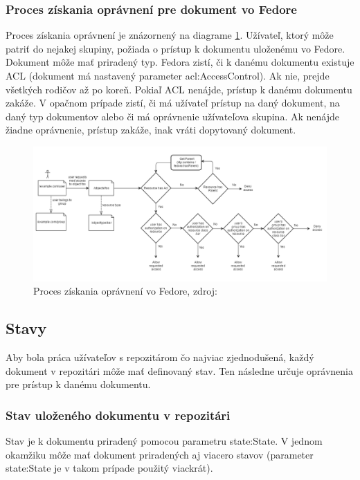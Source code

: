 \documentclass[thesis=M,slovak]{FITthesis}[2013/05/06]
\begin{document}
\subsubsection{Proces získania oprávnení pre dokument vo Fedore}
Proces získania oprávnení je znázornený na diagrame \ref{graphics:ACLFedoraFlow}. Užívateľ, ktorý môže patriť do nejakej skupiny, požiada o prístup k dokumentu uloženému vo Fedore. Dokument môže mať priradený typ. Fedora zistí, či k danému dokumentu existuje ACL (dokument má nastavený parameter acl:AccessControl). Ak nie, prejde všetkých rodičov až po koreň. Pokiaľ ACL nenájde, prístup k danému dokumentu zakáže.
V opačnom prípade zistí, či má užívateľ prístup na daný dokument, na daný typ dokumentov alebo či má oprávnenie užívateľova skupina. Ak nenájde žiadne oprávnenie, prístup zakáže, inak vráti dopytovaný dokument.

\begin{figure}\centering
	\includegraphics[width=1.0\textwidth]{stavy/ACLFedoraFlow.png}
 	\caption[Proces získania oprávnení vo Fedore]{Proces získania oprávnení vo Fedore, zdroj: \cite{FedoraACL}}\label{graphics:ACLFedoraFlow}
\end{figure}

\subsection{Stavy}
Aby bola práca užívateľov s repozitárom čo najviac zjednodušená, každý dokument v repozitári môže mať definovaný stav. Ten následne určuje oprávnenia pre prístup k danému dokumentu.

\subsubsection{Stav uloženého dokumentu v repozitári}
Stav je k dokumentu priradený pomocou parametru state:State. V jednom okamžiku môže mať dokument priradených aj viacero stavov (parameter state:State je v takom prípade použitý viackrát).
\end{document}
